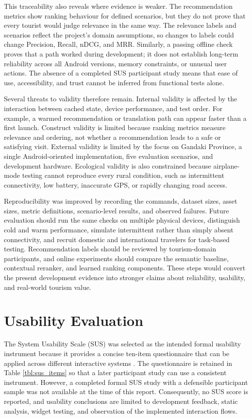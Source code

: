 \documentclass[12pt,a4paper,oneside]{report}
\begin{document}
This traceability also reveals where evidence is weaker. The recommendation metrics show ranking behaviour for defined scenarios, but they do not prove that every tourist would judge relevance in the same way. The relevance labels and scenarios reflect the project's domain assumptions, so changes to labels could change Precision, Recall, nDCG, and MRR. Similarly, a passing offline check proves that a path worked during development; it does not establish long-term reliability across all Android versions, memory constraints, or unusual user actions. The absence of a completed SUS participant study means that ease of use, accessibility, and trust cannot be inferred from functional tests alone.

Several threats to validity therefore remain. Internal validity is affected by the interaction between cached state, device performance, and test order. For example, a warmed recommendation or translation path can appear faster than a first launch. Construct validity is limited because ranking metrics measure relevance and ordering, not whether a recommendation leads to a safe or satisfying visit. External validity is limited by the focus on Gandaki Province, a single Android-oriented implementation, five evaluation scenarios, and development hardware. Ecological validity is also constrained because airplane-mode testing cannot reproduce every rural condition, such as intermittent connectivity, low battery, inaccurate GPS, or rapidly changing road access.

Reproducibility was improved by recording the commands, dataset sizes, asset sizes, metric definitions, scenario-level results, and observed failures. Future evaluation should run the same checks on multiple physical devices, distinguish cold and warm performance, simulate intermittent rather than simply absent connectivity, and recruit domestic and international travelers for task-based testing. Recommendation labels should be reviewed by tourism-domain participants, and online experiments should compare the semantic baseline, contextual reranker, and learned ranking components. These steps would convert the present development evidence into stronger claims about reliability, usability, and real-world tourism value.

\section{Usability Evaluation}
\label{sec:usability}

The System Usability Scale (SUS) was selected as the intended formal usability instrument because it provides a concise ten-item questionnaire that can be applied across different interactive systems \parencite{Brooke1996}. The questionnaire is retained in Table \ref{tbl:sus_items} so that a later participant study can use a consistent instrument. However, a completed formal SUS study with a defensible participant sample was not available at the time of this report. Consequently, no SUS score is reported, and usability conclusions are limited to development feedback, static analysis, widget testing, and observation of the implemented interaction flows.
\end{document}
